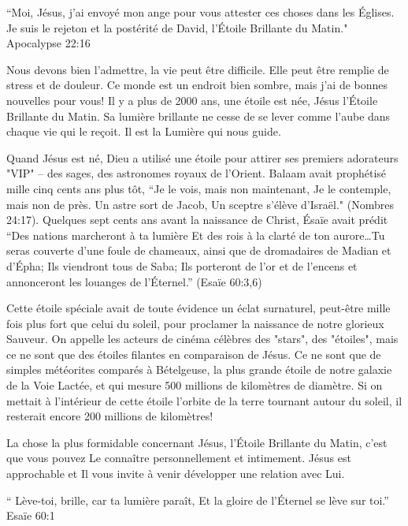 

“Moi, Jésus, j'ai envoyé mon ange pour vous attester ces choses dans les Églises. Je suis le rejeton et la postérité de David, l'Étoile Brillante du Matin." ~ Apocalypse 22:16

Nous devons bien l'admettre, la vie peut être difficile. Elle peut être remplie de stress et de douleur. Ce monde est un endroit bien sombre, mais j'ai de bonnes nouvelles pour vous! Il y a plus de 2000 ans, une étoile est née, Jésus l'Étoile Brillante du Matin. Sa lumière brillante ne cesse de se lever comme l'aube dans chaque vie qui le reçoit. Il est la Lumière qui nous guide.

Quand Jésus est né, Dieu a utilisé une étoile pour attirer ses premiers adorateurs "VIP" – des sages, des astronomes royaux de l'Orient. Balaam avait prophétisé mille cinq cents ans plus tôt, “Je le vois, mais non maintenant, Je le contemple, mais non de près. Un astre sort de Jacob, Un sceptre s’élève d’Israël." (Nombres 24:17). Quelques sept cents ans avant la naissance de Christ, Ésaïe avait prédit “Des nations marcheront à ta lumière Et des rois à la clarté de ton aurore…Tu seras couverte d’une foule de chameaux, ainsi que de dromadaires de Madian et d’Épha; Ils viendront tous de Saba; Ils porteront de l’or et de l’encens et annonceront les louanges de l’Éternel.” (Esaïe 60:3,6)

Cette étoile spéciale avait de toute évidence un éclat surnaturel, peut-être mille fois plus fort que celui du soleil, pour proclamer la naissance de notre glorieux Sauveur. On appelle les acteurs de cinéma célèbres des "stars", des "étoiles", mais ce ne sont que des étoiles filantes en comparaison de Jésus. Ce ne sont que de simples météorites comparés à Bételgeuse, la plus grande étoile de notre galaxie de la Voie Lactée, et qui mesure 500 millions de kilomètres de diamètre. Si on mettait à l'intérieur de cette étoile l'orbite de la terre tournant autour du soleil, il resterait encore 200 millions de kilomètres!

La chose la plus formidable concernant Jésus, l'Étoile Brillante du Matin, c'est que vous pouvez Le connaître personnellement et intimement. Jésus est approchable et Il vous invite à venir développer une relation avec Lui.


“ Lève-toi, brille, car ta lumière paraît, Et la gloire de l’Éternel se lève sur toi.” ~ Esaïe 60:1
             
       

